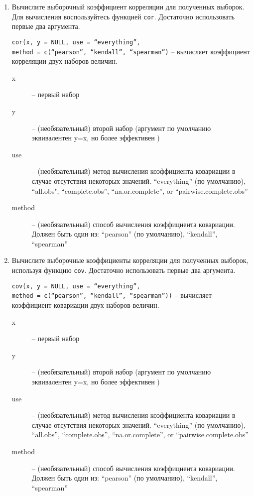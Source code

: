 \begin{enumerate}
    \item Вычислите выборочный коэффициент корреляции для полученных выборок. Для вычисления 
          воспользуйтесь функцией \texttt{cor}. Достаточно использовать первые два аргумента.

          \begin{mdframed}[style=BadassFrame]

              \texttt{cor(x, y = NULL, use = ``everything'', \\ method = c(``pearson'', ``kendall'', ``spearman'')} -- вычисляет коэффициент корреляции двух наборов величин. 
              \begin{description}

                \item[x] -- первый набор
                \item[y] -- (необязательный) второй набор (аргумент по умолчанию эквивалентен y=x, но более эффективен )
                \item[use] -- (необязательный) метод вычисления коэффициента ковариации в случае отсутствия некоторых значений.
                    ``everything'' (по умолчанию), ``all.obs", ``complete.obs'', ``na.or.complete'', or ``pairwise.complete.obs''
                \item[method] -- (необязательный) способ вычисления коэффициента ковариации. Должен быть один из: 
                    ``pearson'' (по умолчанию), ``kendall'', ``spearman''
              \end{description}
          \end{mdframed}

    \item Вычислите выборочные коэффициенты корреляции для полученных выборок, используя функцию 
          \texttt{cov}. Достаточно использовать первые два аргумента.

          \begin{mdframed}[style=BadassFrame]

              \texttt{cov(x, y = NULL, use = ``everything'', \\ method = c(``pearson'', ``kendall'', ``spearman''))} 
                    -- вычисляет коэффициент ковариации двух наборов величин. 
              \begin{description}

                \item[x] -- первый набор
                \item[y] -- (необязательный) второй набор (аргумент по умолчанию эквивалентен y=x, но более эффективен )
                \item[use] -- (необязательный) метод вычисления коэффициента ковариации в случае отсутствия некоторых значений.
                    ``everything'' (по умолчанию), ``all.obs'', ``complete.obs'', ``na.or.complete'', or ``pairwise.complete.obs''
                \item[method] -- (необязательный) способ вычисления коэффициента ковариации. Должен быть один из: 
                    ``pearson'' (по умолчанию), ``kendall'', ``spearman''
              \end{description}
          \end{mdframed}


\end{enumerate}
